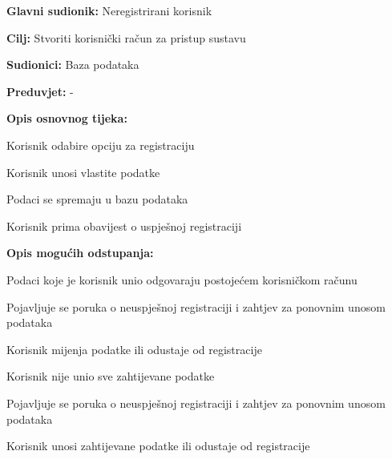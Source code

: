 \noindent {}
\begin{packed_item}

	\item \textbf{Glavni sudionik: }Neregistrirani korisnik
	\item  \textbf{Cilj:} Stvoriti korisnički račun za pristup sustavu
	\item  \textbf{Sudionici:} Baza podataka
	\item  \textbf{Preduvjet:} -
	\item  \textbf{Opis osnovnog tijeka:}

	\item[] \begin{packed_enum}

		\item Korisnik odabire opciju za registraciju
		\item Korisnik unosi vlastite podatke
		\item Podaci se spremaju u bazu podataka
		\item Korisnik prima obavijest o uspješnoj registraciji
	\end{packed_enum}

	\item  \textbf{Opis mogućih odstupanja:}

	\item[] \begin{packed_item}

		\item[2.a] Podaci koje je korisnik unio odgovaraju postojećem korisničkom računu
		\item[] \begin{packed_enum}

			\item Pojavljuje se poruka o neuspješnoj registraciji i zahtjev za ponovnim unosom podataka
			\item Korisnik mijenja podatke ili odustaje od registracije

		\end{packed_enum}
		\item[2.b] Korisnik nije unio sve zahtijevane podatke
		\item[] \begin{packed_enum}

			\item Pojavljuje se poruka o neuspješnoj registraciji i zahtjev za ponovnim unosom podataka
			\item Korisnik unosi zahtijevane podatke ili odustaje od registracije

		\end{packed_enum}

	\end{packed_item}
\end{packed_item}

